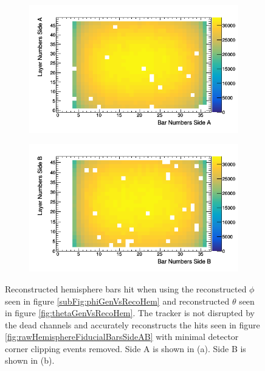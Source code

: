 \begin{figure}[!h]
\centering
\begin{subfigure}{.5\textwidth}
  \centering
  \includegraphics[width=\linewidth]{Chapter5/Figs/Raster/hemisphereFiducialBarsSideA.png}
  \captionsetup{width=.9\linewidth}
  \caption{}
  \label{subFig:hemisphereFiducialBarsSideA}
\end{subfigure}%
\begin{subfigure}{.5\textwidth}
  \centering
\includegraphics[width=\linewidth]{Chapter5/Figs/Raster/hemisphereFiducialBarsSideB.png}
  \captionsetup{width=.9\linewidth}
  \caption{}
  \label{subFig:hemisphereFiducialBarsSideB}
\end{subfigure}
\caption{Reconstructed hemisphere bars hit when using the reconstructed $\phi$ seen in figure \ref{subFig:phiGenVsRecoHem} and reconstructed $\theta$ seen in figure \ref{fig:thetaGenVsRecoHem}. The tracker is not disrupted by the dead channels and accurately reconstructs the hits seen in figure \ref{fig:rawHemisphereFiducialBarsSideAB} with minimal detector corner clipping events removed. Side A is shown in (a). Side B is shown in (b).}
\label{fig:HemisphereFiducialBarsSideAB}
\end{figure}

